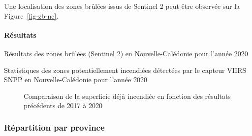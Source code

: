 \documentclass[
  11pt,
  letterpaper,
]{scrreprt}
\let\oldparagraph\paragraph
\renewcommand{\paragraph}[1]{\oldparagraph{#1}\mbox{}}
\begin{document}
Une localisation des zones brûlées issus de Sentinel 2 peut être
observée sur la Figure~\ref{fig-zb-nc}.

\paragraph{Résultats}\label{ruxe9sultats}

\begin{table}

\caption{\label{tbl-stats-feux-nc}Résultats des zones brûlées (Sentinel
2) en Nouvelle-Calédonie pour l'année 2020}


\end{table}%

\begin{table}

\caption{\label{tbl-stats-viirs-nc}Statistiques des zones
potentiellement incendiées détectées par le capteur VIIRS SNPP en
Nouvelle-Calédonie pour l'année 2020}


\end{table}%

\begin{figure}[H]


\caption{\label{fig-diag-zb-new}Comparaison de la superficie déjà
incendiée en fonction des résultats précédents de 2017 à 2020}

\end{figure}%

\subsubsection{Répartition par
province}\label{ruxe9partition-par-province}
\end{document}
